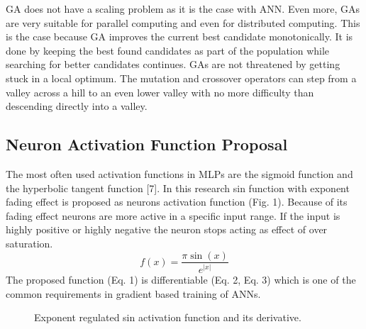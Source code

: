 \documentclass{llncs}
\begin{document}
GA does not have a scaling problem as it is the case with ANN. Even more, GAs are very suitable for parallel computing and even for distributed computing. This is the case because GA improves the current best candidate monotonically. It is done by keeping the best found candidates as part of the population while searching for better candidates continues. GAs are not threatened by getting stuck in a local optimum. The mutation and crossover operators can step from a valley across a hill to an even lower valley with no more difficulty than descending directly into a valley.
%
\subsection{Neuron Activation Function Proposal}
%
The most often used activation functions in MLPs are the sigmoid function and the hyperbolic tangent function [7]. In this research sin function with exponent fading effect is proposed as neurons activation function (Fig. 1). Because of its fading effect neurons are more active in a specific input range. If the input is highly positive or highly negative the neuron stops acting as effect of over saturation.
%
\begin{equation}
f(x) = \frac {\pi \sin(x)} { e^{ |x| }}
\end{equation}
%
The proposed function (Eq. 1) is differentiable (Eq. 2, Eq. 3) which is one of the common requirements in gradient based training of ANNs.
%
\begin{figure}
    \centering
    \caption{Exponent regulated sin activation function and its derivative.}
    \label{fig:fig01}
\end{figure}
\end{document}
